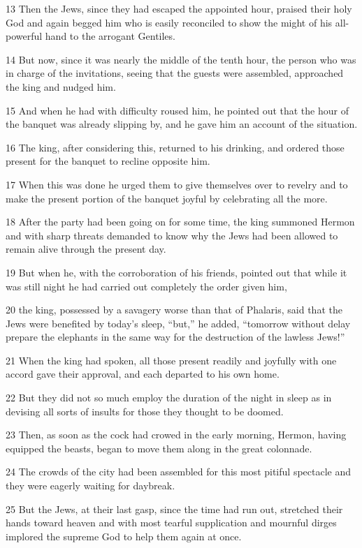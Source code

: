 \par 13 Then the Jews, since they had escaped the appointed hour, praised their holy God and again begged him who is easily reconciled to show the might of his all-powerful hand to the arrogant Gentiles.
\par 14 But now, since it was nearly the middle of the tenth hour, the person who was in charge of the invitations, seeing that the guests were assembled, approached the king and nudged him.
\par 15 And when he had with difficulty roused him, he pointed out that the hour of the banquet was already slipping by, and he gave him an account of the situation.
\par 16 The king, after considering this, returned to his drinking, and ordered those present for the banquet to recline opposite him.
\par 17 When this was done he urged them to give themselves over to revelry and to make the present portion of the banquet joyful by celebrating all the more.
\par 18 After the party had been going on for some time, the king summoned Hermon and with sharp threats demanded to know why the Jews had been allowed to remain alive through the present day.
\par 19 But when he, with the corroboration of his friends, pointed out that while it was still night he had carried out completely the order given him,
\par 20 the king, possessed by a savagery worse than that of Phalaris, said that the Jews were benefited by today's sleep, “but,” he added, “tomorrow without delay prepare the elephants in the same way for the destruction of the lawless Jews!”
\par 21 When the king had spoken, all those present readily and joyfully with one accord gave their approval, and each departed to his own home.
\par 22 But they did not so much employ the duration of the night in sleep as in devising all sorts of insults for those they thought to be doomed.
\par 23 Then, as soon as the cock had crowed in the early morning, Hermon, having equipped the beasts, began to move them along in the great colonnade.
\par 24 The crowds of the city had been assembled for this most pitiful spectacle and they were eagerly waiting for daybreak.
\par 25 But the Jews, at their last gasp, since the time had run out, stretched their hands toward heaven and with most tearful supplication and mournful dirges implored the supreme God to help them again at once.
